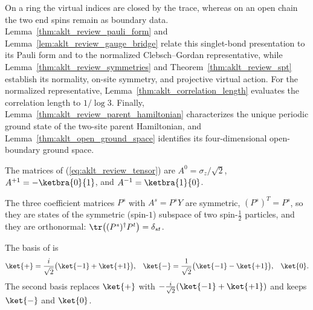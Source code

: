 On a ring the virtual indices are closed by the trace, whereas on an open
chain the two end spins remain as boundary data.
Lemma~\ref{thm:aklt_review_pauli_form} and
Lemma~\ref{lem:aklt_review_gauge_bridge} relate this singlet-bond
presentation to its Pauli form and to the normalized Clebsch--Gordan
representative, while Lemma~\ref{thm:aklt_review_symmetries} and Theorem~\ref{thm:aklt_review_spt} establish its normality, on-site symmetry, and
projective virtual action. For the normalized representative,
Lemma~\ref{thm:aklt_correlation_length} evaluates the correlation length
to $1/\log 3$. Finally, Lemma~\ref{thm:aklt_review_parent_hamiltonian}
characterizes the unique periodic ground state of the two-site parent
Hamiltonian, and Lemma~\ref{thm:aklt_open_ground_space} identifies its
four-dimensional open-boundary ground space.


\begin{lemma}\label{lem:aklt_review_matrices}
    \leanok
    The matrices of (\ref{eq:aklt_review_tensor}) are
    $A^{0}=\sigma_z/\sqrt2$, $A^{+1}=-\ketbra{0}{1}$, and
    $A^{-1}=\ketbra{1}{0}$.
\end{lemma}

\begin{lemma}\label{thm:aklt_review_spin_one}
    \leanok
    The three coefficient matrices $P^{s}$ with $A^{s}=P^{s}Y$ are symmetric,
    $(P^{s})^{T}=P^{s}$, so they are states of the symmetric (spin-$1$)
    subspace of two spin-$\tfrac12$ particles, and they are orthonormal:
    $\tr\big((P^{s})^{\dagger}P^{t}\big)=\delta_{st}$.
\end{lemma}

\begin{definition}\label{def:aklt_review_basis}
    \leanok
    The basis of \cite[Appendix~A, ``The AKLT state'']{Cirac2021Matrix} is
    \begin{align}
        \ket{+} & = \frac{i}{\sqrt2}\big(\ket{-1}+\ket{+1}\big),
                & \ket{-}                                        & = \frac{1}{\sqrt2}\big(\ket{-1}-\ket{+1}\big),
                & \ket{0}.
        \label{eq:aklt_review_basis}
    \end{align}
    The second basis replaces $\ket{+}$ with
    $-\frac{i}{\sqrt2}(\ket{-1}+\ket{+1})$ and keeps $\ket{-}$ and $\ket{0}$.
\end{definition}

